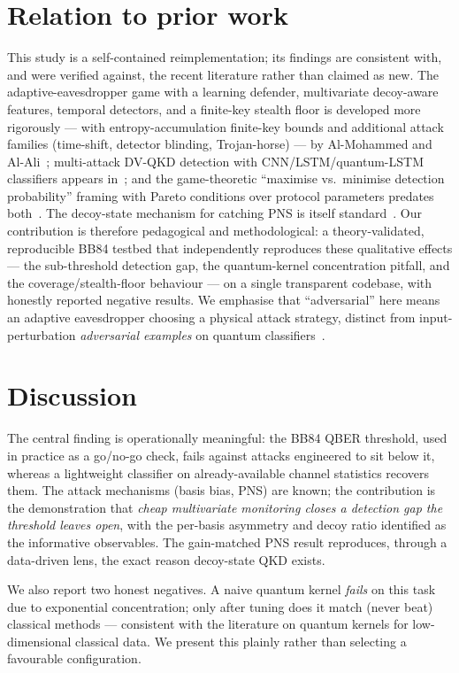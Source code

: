 \documentclass[11pt]{article}
\begin{document}
\section{Relation to prior work}
This study is a self-contained reimplementation; its findings are consistent with,
and were verified against, the recent literature rather than claimed as new. The
adaptive-eavesdropper game with a learning defender, multivariate decoy-aware
features, temporal detectors, and a finite-key stealth floor is developed more
rigorously --- with entropy-accumulation finite-key bounds and additional attack
families (time-shift, detector blinding, Trojan-horse) --- by Al-Mohammed and
Al-Ali~\cite{advgame}; multi-attack DV-QKD detection with CNN/LSTM/quantum-LSTM
classifiers appears in~\cite{qlstm}; and the game-theoretic ``maximise vs.\
minimise detection probability'' framing with Pareto conditions over protocol
parameters predates both~\cite{gametheory}. The decoy-state mechanism for catching
PNS is itself standard~\cite{decoy}. Our contribution is therefore pedagogical and
methodological: a theory-validated, reproducible BB84 testbed that independently
reproduces these qualitative effects --- the sub-threshold detection gap, the
quantum-kernel concentration pitfall, and the coverage/stealth-floor behaviour ---
on a single transparent codebase, with honestly reported negative results. We
emphasise that ``adversarial'' here means an adaptive eavesdropper choosing a
physical attack strategy, distinct from input-perturbation \emph{adversarial
examples} on quantum classifiers~\cite{qmlsok}.

\section{Discussion}
The central finding is operationally meaningful: the BB84 QBER threshold, used in
practice as a go/no-go check, fails against attacks engineered to sit below it,
whereas a lightweight classifier on already-available channel statistics recovers
them. The attack mechanisms (basis bias, PNS) are known; the contribution is the
demonstration that \emph{cheap multivariate monitoring closes a detection gap the
threshold leaves open}, with the per-basis asymmetry and decoy ratio identified as the
informative observables. The gain-matched PNS result reproduces, through a data-driven
lens, the exact reason decoy-state QKD exists.

We also report two honest negatives. A naive quantum kernel \emph{fails} on this task
due to exponential concentration; only after tuning does it match (never beat)
classical methods --- consistent with the literature on quantum kernels for
low-dimensional classical data. We present this plainly rather than selecting a
favourable configuration.
\end{document}
